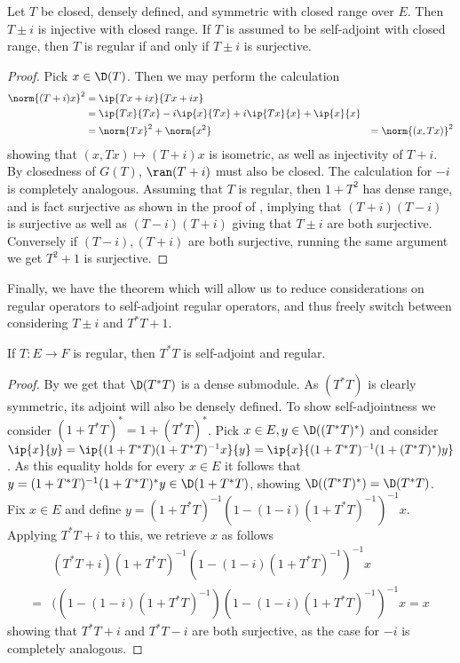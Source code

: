 \begin{proposition}\label{closedrange}
	Let $T$ be closed, densely defined, and symmetric with closed range over $E$. Then $T\pm i$ is injective with closed range. If $T$ is assumed to be self-adjoint with closed range, then $T$ is regular if and only if $T\pm i$ is surjective. 
\end{proposition}
\begin{proof}
	Pick $x\in \D(T)$. Then we may perform the calculation 
	\begin{align*}
		\norm{(T+i)x}^2&=\ip{Tx+ix}{Tx+ix} \\
		&=\ip{Tx}{Tx}-i\ip{x}{Tx}+i\ip{Tx}{x}+\ip{x}{x} \\
		&=\norm{Tx}^2+\norm{x^2}
		&=\norm{(x,Tx)}^2
	\end{align*}
	showing that $(x,Tx)\mapsto (T+i)x$ is isometric, as well as injectivity of $T+i$. By closedness of $G(T)$, $\ran(T+i)$ must also be closed. The calculation for $-i$ is completely analogous. 
	Assuming that $T$ is regular, then $1+T^2$ has dense range, and is fact surjective as shown in the proof of , implying that $(T+i)(T-i)$ is surjective as well as $(T-i)(T+i)$ giving that $T\pm i$ are both surjective. 
	Conversely if $(T-i),(T+i)$ are both surjective, running the same argument we get $T^2+1$ is surjective. 
\end{proof}
Finally, we have the theorem which will allow us to reduce considerations on regular operators to self-adjoint regular operators, and thus freely switch between considering $T\pm i$  and $T^*T+1$. 
\begin{proposition}
	If $T:E\to F$ is regular, then $T^*T$ is self-adjoint and regular. 
\end{proposition}
\begin{proof}
	By  we get that $\D(T^*T)$ is a dense submodule. As $(T^*T)$ is clearly symmetric, its adjoint will also be densely defined. To show self-adjointness we consider $(1+T^*T)^*=1+(T^*T)^*$. Pick $x\in E,y\in \D((T^*T)^*)$ and consider  $\ip{x}{y}=\ip{(1+T^*T)(1+T^*T)^{-1}x}{y}=\ip{x}{(1+T^*T)^{-1}(1+(T^*T)^*)y}$. As this equality holds for every $x\in E$ it follows that $y=(1+T^*T)^{-1}(1+T^*T)^*y\in \D(1+T^*T)$, showing $\D((T^*T)^*)=\D(T^*T)$. 
	Fix $x\in E$ and define $y=(1+T^*T)^{-1}(1-(1-i)(1+T^*T)^{-1})^{-1}x$. Applying $T^*T+i$ to this, we retrieve $x$ as follows
	\begin{align*}
		&(T^*T+i)(1+T^*T)^{-1}(1-(1-i)(1+T^*T)^{-1})^{-1}x \\ 
		=&((1-(1-i)(1+T^*T)^{-1})(1-(1-i)(1+T^*T)^{-1})^{-1}x=x
	\end{align*}
	showing that $T^*T+i$ and $T^*T-i$ are both surjective, as the case for $-i$ is completely analogous.
\end{proof}
